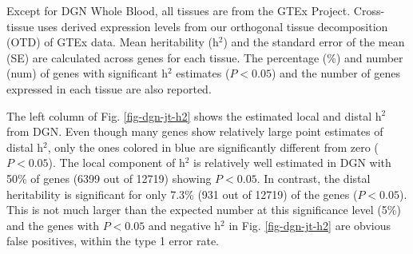 \documentclass[10pt,letterpaper]{article}
\begin{document}
\begin{table}[!ht]
\begin{adjustwidth}{-2.25in}{0in}
\begin{tabular}{lrrrrr}
   \hline
\end{tabular}
\begin{flushleft} Except for DGN Whole Blood, all tissues are from the GTEx Project. Cross-tissue uses derived expression levels from our orthogonal tissue decomposition (OTD) of GTEx data. Mean heritability (h$^2$) and the standard error of the mean (SE) are calculated across genes for each tissue. The percentage (\%) and number (num) of genes with significant h$^2$ estimates ($P<0.05$) and the number of genes expressed in each tissue are also reported. 
\end{flushleft}
\label{table-h2}
\end{adjustwidth}
\end{table}

The left column of Fig. \ref{fig-dgn-jt-h2} shows the estimated local and distal h$^2$ from DGN. Even though many genes show relatively large point estimates of distal h$^2$, only the ones colored in blue are significantly different from zero ($P < 0.05$). The local component of h$^2$ is relatively well estimated in DGN with 50\% of genes  (6399 out of 12719) showing $P < 0.05$. %
 In contrast, the distal heritability is significant for only 7.3\% (931 out of 12719) of the genes ($P < 0.05$). This is not much larger than the expected number at this significance level (5\%) and the genes with $P<0.05$ and negative h$^2$ in Fig. \ref{fig-dgn-jt-h2} are obvious false positives, within the type 1 error rate.
\end{document}
